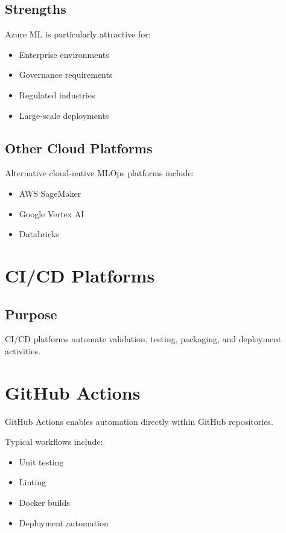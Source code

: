\subsection{Strengths}

Azure ML is particularly attractive for:

\begin{itemize}
    \item Enterprise environments
    \item Governance requirements
    \item Regulated industries
    \item Large-scale deployments
\end{itemize}

\subsection{Other Cloud Platforms}

Alternative cloud-native MLOps platforms include:

\begin{itemize}
    \item AWS SageMaker
    \item Google Vertex AI
    \item Databricks
\end{itemize}

\section{CI/CD Platforms}

\subsection{Purpose}

CI/CD platforms automate validation, testing, packaging, and deployment activities.

\section{GitHub Actions}

GitHub Actions enables automation directly within GitHub repositories.

Typical workflows include:

\begin{itemize}
    \item Unit testing
    \item Linting
    \item Docker builds
    \item Deployment automation
\end{itemize}

